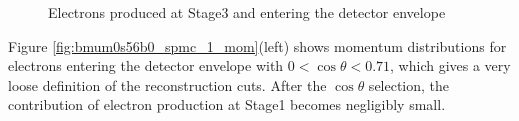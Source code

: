 \documentclass[12pt]{article}
\begin{document}
\begin{figure}[h]
  \hspace{-0.5in}
  \caption{
    \label{fig_bmum0s59b0_cth_vs_mom}
    Electrons produced at Stage3 and entering the detector envelope
  }
\end{figure}

Figure \ref{fig:bmum0s56b0_spmc_1_mom}(left) shows momentum distributions for electrons
entering the detector envelope with $0 < \cos \theta < 0.71$,
which gives a very loose definition of the reconstruction cuts.
After the $\cos \theta$ selection, the contribution of electron production
at Stage1 becomes negligibly small.
\end{document}

